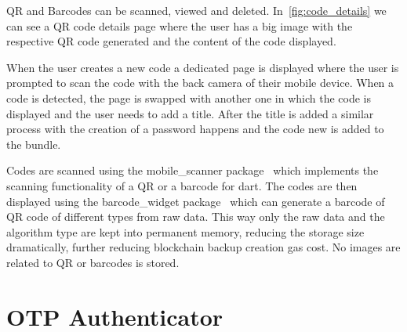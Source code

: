 \documentclass[a4paper,12pt]{report}
\begin{document}
QR and Barcodes can be scanned, viewed and deleted.
In~\autoref{fig:code_details} we can see a QR code details page where the user
has a big image with the respective QR code generated and the content of the
code displayed.

When the user creates a new code a dedicated page is displayed where the user
is prompted to scan the code with the back camera of their mobile device. When
a code is detected, the page is swapped with another one in which the code is
displayed and the user needs to add a title. After the title is added a similar
process with the creation of a password happens and the code new is added to
the bundle.

Codes are scanned using the mobile\_scanner package~\cite{mobileScannerDocs}
which implements the scanning functionality of a QR or a barcode for dart. The
codes are then displayed using the barcode\_widget
package~\cite{barcodeWidgetDocs} which can generate a barcode of QR code of
different types from raw data. This way only the raw data and the algorithm
type are kept into permanent memory, reducing the storage size dramatically,
further reducing blockchain backup creation gas cost. No images are related to
QR or barcodes is stored.

\section{OTP Authenticator}
\end{document}
